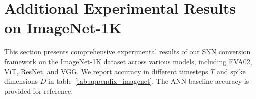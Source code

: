 
\section{Additional Experimental Results on ImageNet-1K}\label{overall_imagenet}

This section presents comprehensive experimental results of our SNN conversion framework on the ImageNet-1K dataset across various models, including EVA02, ViT, ResNet, and VGG. We report accuracy in different timesteps \(T\) and spike dimensions \(D\) in table~\ref{tab:appendix_imagenet}. The ANN baseline accuracy is provided for reference.

